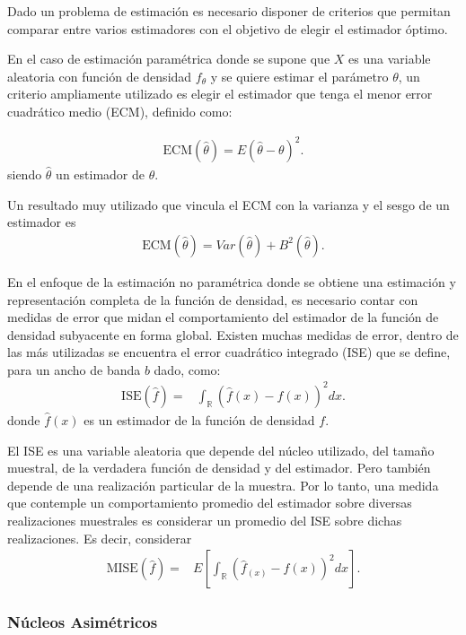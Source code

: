 Dado un problema de estimación es necesario disponer de criterios que permitan comparar entre varios estimadores con el objetivo de elegir el estimador óptimo. 

En el caso de estimación paramétrica donde se supone que $X$ es una variable aleatoria con función de densidad $f_{\theta}$ y se quiere estimar el parámetro $\theta$, un criterio ampliamente utilizado es elegir el estimador que tenga el menor error cuadrático medio (ECM), definido como:

\begin{align}
\label{ErrorCuadraticoMedio}
\text{ECM}(\hat{\theta})=E(\widehat{\theta}-\theta)^2.
\end{align}
siendo $\widehat{\theta}$ un estimador de $\theta$. 

Un resultado muy utilizado que vincula el ECM con la varianza y el sesgo de un estimador es
\begin{align}
\text{ECM}(\hat{\theta})=Var(\hat{\theta})+B^2(\hat{\theta}).
\end{align}	

En el enfoque de la estimación no paramétrica donde se obtiene una estimación y representación completa de la función de densidad, es necesario contar con medidas de error que midan el comportamiento del estimador de la función de densidad subyacente en forma global. Existen muchas medidas de error, dentro de las más utilizadas se encuentra el error cuadrático integrado (ISE) que se define, para un ancho de banda $b$ dado, como:
\begin{align}
\text{ISE}(\widehat{f})=&\int_\mathbb{R} (\widehat{f}(x)-f(x))^2 dx .
\end{align}
donde $\widehat{f}(x)$ es un estimador de la función de densidad $f$.

El ISE es una variable aleatoria que depende del núcleo utilizado, del tamaño muestral, de la verdadera función de densidad y del estimador. Pero también depende de una realización particular de la muestra. Por lo tanto, una medida que contemple un comportamiento promedio del estimador sobre diversas realizaciones muestrales es considerar un promedio del ISE sobre dichas realizaciones. Es decir, considerar
\begin{align}
\label{MISE}
	\text{MISE}(\widehat{f})=&E[\int_\mathbb{R} (\widehat{f}_(x)-f(x))^2 dx ].
\end{align}

\subsubsection{Núcleos Asimétricos}
\label{NucleosAsimetricos}

